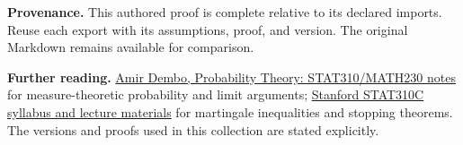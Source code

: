 \documentclass[preprint,12pt,aps,pra,showkeys,amsmath,amssymb,superscriptaddress,floatfix]{revtex4-2}
\theoremstyle{definition}
\theoremstyle{remark}
\begin{document}
\par\medskip\begingroup\small\linespread{1.0}\selectfont\noindent\textbf{Provenance.} This authored proof is complete relative to its declared imports. Reuse
each export with its assumptions, proof, and version. The original
Markdown remains available for comparison.
\par\endgroup

\par\smallskip\begingroup\small\linespread{1.0}\selectfont\noindent\textbf{Further reading.} \href{https://stanford.edu/~montanar/TEACHING/Stat310A/lnotes.pdf}{Amir
Dembo, Probability Theory: STAT310/MATH230 notes} for measure-theoretic
probability and limit arguments;
\href{https://web.stanford.edu/class/stats310c/syllabus.html}{Stanford
STAT310C syllabus and lecture materials} for martingale inequalities and
stopping theorems. The versions and proofs used in this collection are
stated explicitly.\par\endgroup
\end{document}
